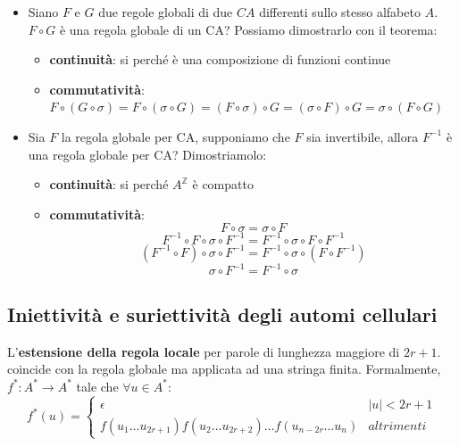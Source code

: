 \begin{itemize}
    \item Siano $F$ e $G$ due regole globali di due $CA$ differenti sullo stesso
          alfabeto $A$. $F\circ G$ è una regola globale di un CA? Possiamo dimostrarlo con
          il teorema:
          \begin{itemize}
              \item \textbf{continuità}: si perché è una composizione di funzioni continue
              \item \textbf{commutatività}: $F\circ (G\circ \sigma) = F\circ (\sigma\circ G) = (F\circ \sigma)\circ G =(\sigma\circ F)\circ G = \sigma\circ (F\circ G)$
          \end{itemize}
    \item Sia $F$ la regola globale per CA, supponiamo che $F$ sia invertibile,
          allora $F^{-1}$ è una regola globale per CA? Dimostriamolo:
          \begin{itemize}
              \item \textbf{continuità}: si perché $A^\mathbb{Z}$ è compatto
              \item \textbf{commutatività}: $$F\circ \sigma = \sigma \circ F $$
                    $$ F^{-1} \circ F\circ \sigma \circ F^{-1}= F^{-1}\circ \sigma \circ F \circ F^{-1}$$
                    $$ (F^{-1} \circ F)\circ \sigma \circ F^{-1}= F^{-1}\circ \sigma \circ (F \circ F^{-1})$$
                    $$ \sigma \circ F^{-1}= F^{-1}\circ \sigma$$
          \end{itemize}
\end{itemize}

\subsection{Iniettività e suriettività degli automi cellulari}

\begin{definizione} 
    L'\textbf{estensione della regola locale} per parole di lunghezza maggiore di
    $2r+1$. coincide con la regola globale ma
    applicata ad una stringa finita. Formalmente, $f^\ast: A^\ast\rightarrow A^\ast$
    tale che $\forall u\in A^\ast$:
    \begin{equation*}
        f^\ast(u) = \begin{cases}
            \epsilon                                                             & |u| < 2r+1 \\
            f(u_1\dots u_{2r+1})f(u_2\dots u_{2r+2})\dots f(u_{n-2r}\dots u_{n}) & altrimenti
        \end{cases}
    \end{equation*}
\end{definizione}

